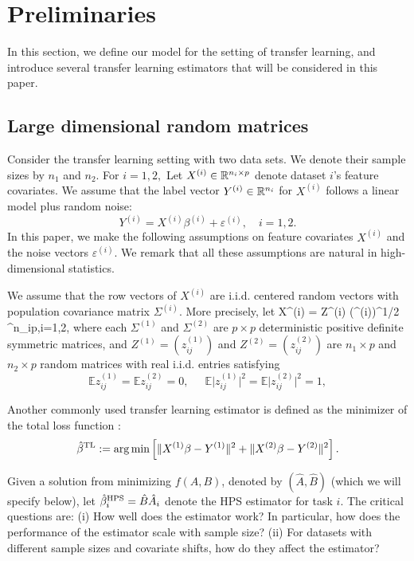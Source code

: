 \section{Preliminaries}\label{sec_HPS}
In this section, we define our model for the setting of transfer learning, and introduce several transfer learning estimators that will be considered in this paper.


\subsection{Large dimensional random matrices}

Consider the transfer learning setting with two data sets. We denote their sample sizes by $n_1$ and $n_2$. For $i=1,2,$ Let $X^{(i)} \in \mathbb{R}^{n_i \times p}$ denote dataset $i$'s feature covariates. We assume that the label vector $Y^{(i)} \in \mathbb{R}^{n_i}$ for $X^{(i)}$ follows a linear model plus random noise:
$$Y^{(i)}= X^{(i)}\beta^{(i)} + \varepsilon^{(i)},\quad i=1,2.$$
In this paper, we make the following assumptions on feature covariates $X^{(i)}$ and the noise vectors $\varepsilon^{(i)}$. We remark that all these assumptions are natural in high-dimensional statistics.

We assume that the row vectors of $X^{(i)}$ are i.i.d. centered random vectors with  population covariance matrix $\Sigma^{(i)}$. More precisely, let
\be\label{XofZ}X^{(i)} = Z^{(i)} (\Sigma^{(i)})^{1/2} \in \real^{n_i\times p},\quad i=1,2, \ee
where each $\Sigma^{(1)}$ and $\Sigma^{(2)}$ are $p\times p$ deterministic positive definite symmetric matrices, and $Z^{(1)}=(z^{(1)}_{ij})$ and $Z^{(2)}=(z^{(2)}_{ij})$ are $n_1\times p$ and $n_2\times p$ random matrices with real i.i.d. entries satisfying
\begin{equation}\label{assm1}
\mathbb{E} z^{(1)}_{ij}=\mathbb{E} z^{(2)}_{ij} =0, \ \quad \ \mathbb{E} \vert z^{(1)}_{ij} \vert^2=\mathbb{E} \vert z^{(2)}_{ij} \vert^2 =1,
\end{equation}

Another commonly used transfer learning estimator is defined as the minimizer of the total loss function \cite{bastani2020predicting, li2020transfer}:
$$\hat \beta^{\rm{TL}} := \operatorname*{arg\,min}\left[ \|X^{(1)} \beta - Y^{(1)}\|^2 + \|X^{(2)} \beta - Y^{(2)}\|^2\right].$$

Given a solution from minimizing $f(A, B)$, denoted by $(\hat{A}, \hat{B})$  (which we will specify below), let $\hat{\beta}_i^{\textup{HPS}} = \hat{B} \hat{A}_i$ denote the HPS estimator for task $i$.
The critical questions are:
(i) How well does the estimator work? In particular, how does the performance of the estimator scale with sample size?
(ii) For datasets with different sample sizes and covariate shifts, how do they affect the estimator?


